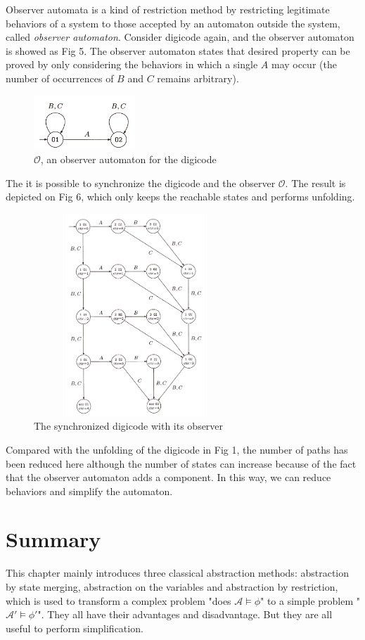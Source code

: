 \documentclass{acmtog} %
\begin{document}
        Observer automata is a kind of restriction method by restricting legitimate behaviors of a system to those accepted by an automaton outside the system, called \textit{observer automaton}. Consider digicode again, and the observer automaton is showed as Fig 5. The observer automaton states that desired property can be proved by only considering the behaviors in which a single $A$ may occur (the number of occurrences of $B$ and $C$ remains arbitrary).
        \begin{figure}[H]
          \centering
          \includegraphics[width=1.5in, height=0.8in]{4.png}
          \caption{$\mathcal{O}$, an observer automaton for the digicode}
        \end{figure}
        
        The it is possible to synchronize the digicode and the observer $\mathcal{O}$. The result is depicted on Fig 6, which only keeps the reachable states and performs unfolding.
        \begin{figure}[H]
          \centering
          \includegraphics[width=3.0in, height=3.0in]{6.png}
          \caption{The synchronized digicode with its observer}
        \end{figure}
        
        Compared with the unfolding of the digicode in Fig 1, the number of paths has been reduced here although the number of states can increase because of the fact that the observer automaton adds a component. In this way, we can reduce behaviors and simplify the automaton. 
\section{Summary}
    \quad This chapter mainly introduces three classical abstraction methods:  abstraction by state merging, abstraction on the variables and abstraction by restriction, which is used to transform a complex problem "does $\mathcal{A}\models\phi$" to a simple problem "$\mathcal{A}'\models\phi'$". They all have their advantages and disadvantage. But they are all useful to perform simplification.
\end{document}
